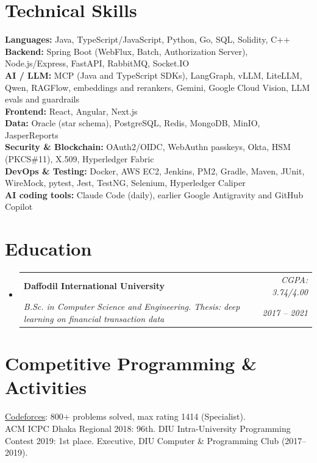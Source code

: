 \documentclass[letterpaper,11pt]{article}
\makeatletter
\newcommand{\resumeSubheading}[4]{
  \vspace{-2pt}\item
    \begin{tabular*}{0.97\textwidth}[t]{l@{\extracolsep{\fill}}r}
      \textbf{#1} & #2 \\
      \textit{\small#3} & \textit{\small #4} \\
    \end{tabular*}\vspace{-7pt}
}
\newcommand{\resumeSubHeadingListStart}{\begin{itemize}[leftmargin=0.15in,label={}]}
\newcommand{\resumeSubHeadingListEnd}{\end{itemize}}
\makeatother
\begin{document}
\section{Technical Skills}
\begin{itemize}[leftmargin=0.15in, label={}]
  \small{\item{
  \textbf{Languages:} Java, TypeScript/JavaScript, Python, Go, SQL, Solidity, C++ \\ \vspace{2pt}
  \textbf{Backend:} Spring Boot (WebFlux, Batch, Authorization Server), Node.js/Express, FastAPI, RabbitMQ, Socket.IO \\ \vspace{2pt}
  \textbf{AI / LLM:} MCP (Java and TypeScript SDKs), LangGraph, vLLM, LiteLLM, Qwen, RAGFlow, embeddings and rerankers,
  Gemini, Google Cloud Vision, LLM evals and guardrails \\ \vspace{2pt}
  \textbf{Frontend:} React, Angular, Next.js \\ \vspace{2pt}
  \textbf{Data:} Oracle (star schema), PostgreSQL, Redis, MongoDB, MinIO, JasperReports \\ \vspace{2pt}
  \textbf{Security \& Blockchain:} OAuth2/OIDC, WebAuthn passkeys, Okta, HSM (PKCS\#11), X.509, Hyperledger Fabric \\ \vspace{2pt}
  \textbf{DevOps \& Testing:} Docker, AWS EC2, Jenkins, PM2, Gradle, Maven, JUnit, WireMock, pytest, Jest, TestNG, Selenium, Hyperledger Caliper \\ \vspace{2pt}
  \textbf{AI coding tools:} Claude Code (daily), earlier Google Antigravity and GitHub Copilot
  }}
\end{itemize}

\section{Education}
\resumeSubHeadingListStart
  \resumeSubheading
    {Daffodil International University}{\emph{CGPA: 3.74/4.00}}
    {B.Sc. in Computer Science and Engineering. Thesis: deep learning on financial transaction data}{\emph{2017 -- 2021}}
\resumeSubHeadingListEnd

\section{Competitive Programming \& Activities}
\begin{itemize}[leftmargin=0.15in, label={}]
  \small{\item{
  \href{https://codeforces.com/profile/badTouch}{\underline{Codeforces}}: 800+ problems solved, max rating 1414 (Specialist). \\ \vspace{2pt}
  ACM ICPC Dhaka Regional 2018: 96th. DIU Intra-University Programming Contest 2019: 1st place. Executive, DIU Computer \& Programming Club (2017--2019).
  }}
\end{itemize}
\end{document}
